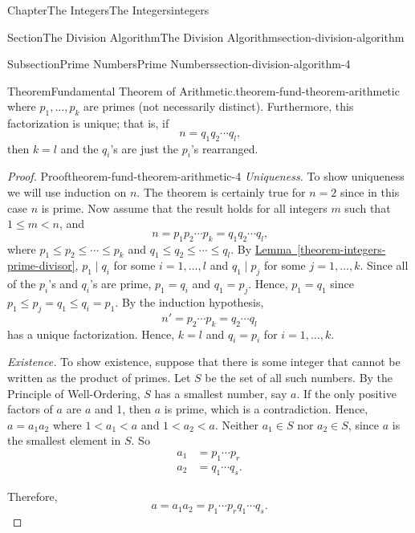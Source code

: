 \documentclass[oneside,10pt,]{book}
\newcommand{\xreffont}{\relax}
\numberwithin{equation}{section}
\newcommand{\lt}{<}
\begin{document}
\begin{chapterptx}{Chapter}{The Integers}{}{The Integers}{}{}{integers}
\begin{sectionptx}{Section}{The Division Algorithm}{}{The Division Algorithm}{}{}{section-division-algorithm}
\begin{subsectionptx}{Subsection}{Prime Numbers}{}{Prime Numbers}{}{}{section-division-algorithm-4}
\begin{theorem}{Theorem}{Fundamental Theorem of Arithmetic.}{}{theorem-fund-theorem-arithmetic}
\begin{equation*}
\end{equation*}
where \(p_1, \ldots, p_k\) are  primes (not necessarily distinct).  Furthermore, this factorization is unique; that is, if%
\begin{equation*}
n = q_1 q_2 \cdots q_l\text{,}
\end{equation*}
then \(k = l\) and the \(q_i\)'s are just the \(p_i\)'s rearranged.%
\end{theorem}
\begin{proof}{Proof}{}{theorem-fund-theorem-arithmetic-4}
\emph{Uniqueness.}  To show uniqueness we will use induction on \(n\). The theorem is certainly true for \(n = 2\) since in this case \(n\) is prime.  Now assume that the result holds for all integers \(m\) such that \(1 \leq m \lt n\), and%
\begin{equation*}
n = p_1 p_2 \cdots p_k = q_1 q_2 \cdots q_l\text{,}
\end{equation*}
where \(p_1 \leq p_2 \leq \cdots \leq p_k\) and \(q_1 \leq q_2 \leq \cdots \leq q_l\). By \hyperref[theorem-integers-prime-divisor]{Lemma~{\xreffont\ref{theorem-integers-prime-divisor}}}, \(p_1  \mid  q_i\) for some \(i = 1, \ldots, l\) and \(q_1  \mid  p_j\) for some \(j = 1, \ldots, k\).  Since all of the \(p_i\)'s and \(q_i\)'s are prime, \(p_1 = q_i\) and  \(q_1 = p_j\). Hence, \(p_1 = q_1\) since \(p_1 \leq p_j = q_1 \leq q_i = p_1\).  By the induction hypothesis,%
\begin{equation*}
n' = p_2 \cdots p_k = q_2 \cdots q_l
\end{equation*}
has a unique factorization.  Hence, \(k = l\) and \(q_i = p_i\) for \(i = 1, \ldots, k\).%
\par
\emph{Existence.} To show existence, suppose that there is some integer that cannot be written as the product of primes.  Let \(S\) be the set of all such numbers.  By the Principle of Well-Ordering, \(S\) has a smallest number, say \(a\).  If the only positive factors of \(a\) are \(a\) and 1, then \(a\) is prime, which is a contradiction.  Hence, \(a = a_1 a_2\) where \(1 \lt a_1 \lt a\) and \(1 \lt a_2 \lt a\).  Neither \(a_1\in S\) nor \(a_2 \in S\), since \(a\) is the smallest element in \(S\).  So%
\begin{align*}
a_1 & = p_1 \cdots p_r\\
a_2 & = q_1 \cdots q_s\text{.}
\end{align*}
%
\par
Therefore,%
\begin{equation*}
a = a_1 a_2 = p_1 \cdots p_r q_1 \cdots q_s\text{.}
\end{equation*}

\end{proof}
\end{subsectionptx}
\end{sectionptx}
\end{chapterptx}
\end{document}
